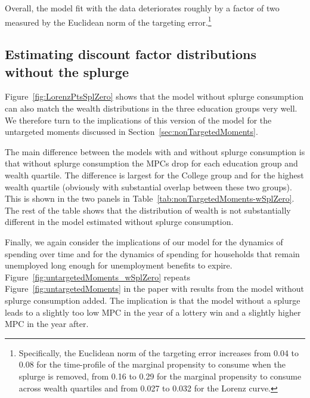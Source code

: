 \documentclass[\latexroot/\projectname]{subfiles}
\begin{document}
Overall, the model fit with the data deteriorates roughly by a factor of two measured by the Euclidean norm of the targeting error.\footnote{Specifically, the Euclidean norm of the targeting error increases from 0.04 to 0.08 for the time-profile of the marginal propensity to consume when the splurge is removed, from 0.16 to 0.29 for the marginal propensity to consume across wealth quartiles and from 0.027 to 0.032 for the Lorenz curve.}



\subsection{Estimating discount factor distributions without the splurge}
\whenintegrated{\label{app:nosplurge-estimating-betas}} %

Figure~\ref{fig:LorenzPtsSplZero} shows that the model without splurge consumption can also match the wealth distributions in the three education groups very well. We therefore turn to the implications of this version of the model for the untargeted moments discussed in Section~\ref{sec:nonTargetedMoments}.



The main difference between the models with and without splurge consumption is that without splurge consumption the MPCs drop for each education group and wealth quartile.
The difference is largest for the College group and for the highest wealth quartile (obviously with substantial overlap between these two groups). This is shown in the two panels in Table~\ref{tab:nonTargetedMoments-wSplZero}. The rest of the table shows that the distribution of wealth is not substantially different in the model estimated without splurge consumption.



Finally, we again consider the  implications of our model for the dynamics of spending over time and for the dynamics of spending for households that remain unemployed long enough for unemployment benefits to expire. Figure~\ref{fig:untargetedMoments_wSplZero} repeats Figure~\ref{fig:untargetedMoments} in the paper with results from the model without splurge consumption added. The implication is that the model without a splurge leads to a slightly too low MPC in the year of a lottery win and a slightly higher MPC in the year after.
\end{document}
